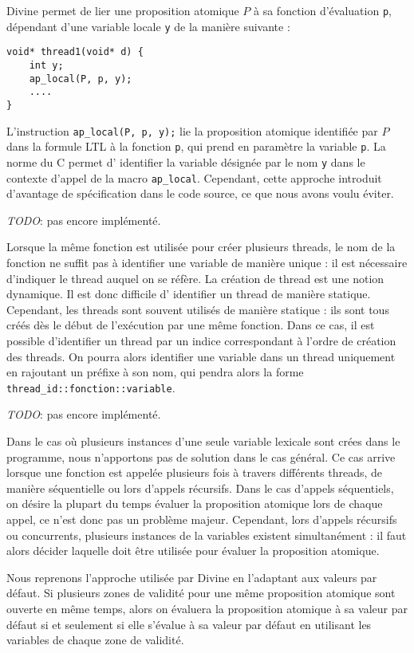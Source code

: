 Divine permet de lier une proposition atomique \(P\) à sa fonction
d'évaluation \texttt{p}, dépendant d'une variable locale
\texttt{y} de la manière suivante :

\begin{lstlisting}
void* thread1(void* d) {
    int y;
    ap_local(P, p, y);
    ....
}
\end{lstlisting}

L'instruction \texttt{ap\_local(P, p, y);} lie la proposition atomique
identifiée par \(P\) dans la formule LTL à la fonction \texttt{p}, qui prend
en paramètre la variable \texttt{p}. La norme du C permet d' identifier la
variable désignée par le nom \texttt{y} dans le contexte d'appel de la macro
\texttt{ap\_local}. Cependant, cette approche introduit d'avantage de
spécification dans le code source, ce que nous avons voulu éviter.

\emph{TODO}: pas encore implémenté.

Lorsque la même fonction est utilisée pour créer plusieurs threads, le
nom de la fonction ne suffit pas à identifier une variable de manière
unique : il est nécessaire d'indiquer le thread auquel on se réfère. La
création de thread est une notion dynamique. Il est donc difficile d'
identifier un thread de manière statique. Cependant, les threads sont
souvent utilisés de manière statique : ils sont tous créés dès le début
de l'exécution par une même fonction. Dans ce cas, il est possible
d'identifier un thread par un indice correspondant à l'ordre de création
des threads. On pourra alors identifier une variable dans un thread
uniquement en rajoutant un préfixe à son nom, qui pendra alors la forme
\texttt{{thread\_id}::{fonction}::{variable}}.

\emph{TODO}: pas encore implémenté.

Dans le cas où plusieurs instances d'une seule variable lexicale sont
crées dans le programme, nous n'apportons pas de solution dans le cas
général. Ce cas arrive lorsque une fonction est appelée plusieurs fois à
travers différents threads, de manière séquentielle ou lors d'appels
récursifs. Dans le cas d'appels séquentiels, on désire la plupart du
temps évaluer la proposition atomique lors de chaque appel, ce n'est
donc pas un problème majeur. Cependant, lors d'appels récursifs ou
concurrents, plusieurs instances de la variables existent simultanément
: il faut alors décider laquelle doit être utilisée pour évaluer la
proposition atomique.

Nous reprenons l'approche utilisée par Divine \cite{Divine_LTL} en
l'adaptant aux valeurs par défaut. Si plusieurs zones de validité pour
une même proposition atomique sont ouverte en même temps, alors on
évaluera la proposition atomique à sa valeur par défaut si et seulement
si elle s'évalue à sa valeur par défaut en utilisant les variables de
chaque zone de validité.

